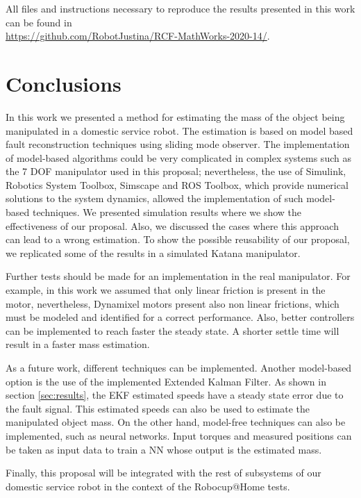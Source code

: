 \documentclass[a4paper, 10pt]{article}
\begin{document}
All files and instructions necessary to reproduce the results presented in this work can be found in\\ \url{https://github.com/RobotJustina/RCF-MathWorks-2020-14/}. 

\section{Conclusions}
\label{sec:conclusions}
In this work we presented a method for estimating the mass of the object being manipulated in a domestic service robot. The estimation is based on model based fault reconstruction techniques using sliding mode observer. The implementation of model-based algorithms could be very complicated in complex systems such as the 7 DOF manipulator used in this proposal; nevertheless, the use of Simulink, Robotics System Toolbox, Simscape and ROS Toolbox, which provide numerical solutions to the system dynamics, allowed the implementation of such model-based techniques. We presented simulation results where we show the effectiveness of our proposal. Also, we discussed the cases where this approach can lead to a wrong estimation. To show the possible reusability of our proposal, we replicated some of the results in a simulated Katana manipulator. 

Further tests should be made for an implementation in the real manipulator. For example, in this work we assumed that only linear friction is present in the motor, nevertheless, Dynamixel motors present also non linear frictions, which must be modeled and identified for a correct performance. Also, better controllers can be implemented to reach faster the steady state. A shorter settle time will result in a faster mass estimation. 

As a future work, different techniques can be implemented. Another model-based option is the use of the implemented Extended Kalman Filter. As shown in section \ref{sec:results}, the EKF estimated speeds have a steady state error due to the fault signal. This estimated speeds can also be used to estimate the manipulated object mass. On the other hand, model-free techniques can also be implemented, such as neural networks. Input torques and measured positions can be taken as input data to train a NN whose output is the estimated mass.

Finally, this proposal will be integrated with the rest of subsystems of our domestic service robot in the context of the Robocup@Home tests. 




\end{document}
